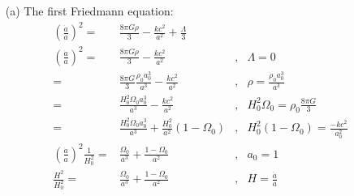 \documentclass[10pt,a4paper]{article}
\begin{document}
\begin{itemize}
	\item[(a)] The first Friedmann equation:
	\begin{align*}
		(\frac{\dot a}{a})^{2} =& \frac{8 \pi G \rho}{3} - \frac{kc^{2}}{a^{2}} + \frac{\Lambda}{3} & \\
		(\frac{\dot a}{a})^{2} =& \frac{8 \pi G \rho}{3} - \frac{kc^{2}}{a^{2}} &,& \Lambda = 0 \\
		=& \frac{8 \pi G}{3}\frac{\rho_{0}a_{0}^{3}}{a^{3}} - \frac{kc^{2}}{a^{2}} &,& \rho = \frac{\rho_{0} a_{0}^{3}}{a^{3}} \\
		=& \frac{H_{0}^{2}\Omega_{0}a_{0}^{3}}{a^{3}} - \frac{kc^{2}}{a^{2}} &,& H_{0}^{2}\Omega_{0} = \rho_{0} \frac{8 \pi G}{3} \\
		=& \frac{H_{0}^{2} \Omega_{0}a_{0}^{3}}{a^{3}} + \frac{H_{0}^{2}}{a^{2}}(1-\Omega_{0}) &,& H_{0}^{2}(1-\Omega_{0}) = \frac{-kc^{2}}{a_{0}^{2}} \\
		(\frac{\dot a}{a})^{2}\frac{1}{H_{0}^{2}} =& \frac{\Omega_{0}}{a^{3}} + \frac{1-\Omega_{0}}{a^{2}} &,& a_{0} = 1 \\
		\frac{H^{2}}{H_{0}^{2}} =& \frac{\Omega_{0}}{a^{3}} + \frac{1-\Omega_{0}}{a^{2}} &,& H = \frac{\dot a}{a} \\
	\end{align*}
	

\end{itemize}
\end{document}
